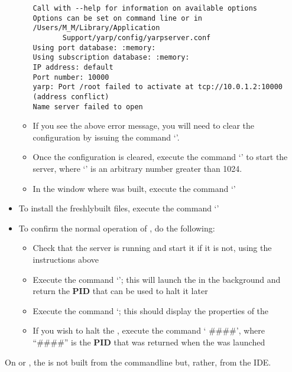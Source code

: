 \begin{itemize}
\begin{itemize}
\begin{verbatim}
Call with --help for information on available options
Options can be set on command line or in /Users/M_M/Library/Application
       Support/yarp/config/yarpserver.conf
Using port database: :memory:
Using subscription database: :memory:
IP address: default
Port number: 10000
yarp: Port /root failed to activate at tcp://10.0.1.2:10000 (address conflict)
Name server failed to open
\end{verbatim}
\outputEnd
\item\exSp{}If you see the above error message, you will need to clear the \yarp{}
configuration by issuing the command `'.
\item\exSp{}Once the \yarp{} configuration is cleared, execute the command
`' to start the \yarp{}
server, where `' is an arbitrary number greater than 1024.
\item\exSp{}In the  window where \mplusm{} was built, execute the command
`'
\end{itemize}
\item\exSp{}To install the freshly\longDash{}built \mplusm{} files, execute the command
`'
\item\exSp{}To confirm the normal operation of \mplusm, do the following:
\begin{itemize}
\item Check that the \yarp{} server is running and start it if it is not, using the
instructions above
\item\exSp{}Execute the command `'; this will launch the
 in the background and return the \textbf{PID} that can
be used to halt it later
\item\exSp{}Execute the command `; this should display the
properties of the 
\item\exSp{}If you wish to halt the , execute the
command ` \#\#\#\#', where ``\#\#\#\#'' is the \textbf{PID} that was
returned when the  was launched
\end{itemize}
\end{itemize}
\tertiaryEnd
\secondaryEnd
{}
On \mac{} or \win, the \textit{\MMMU} is not built from the command\longDash{}line but,
rather, from the IDE.
